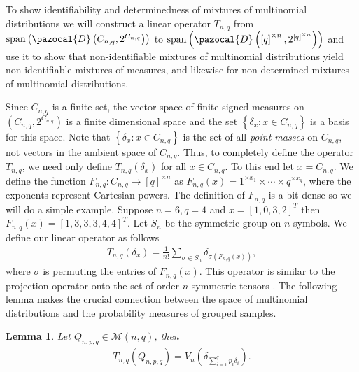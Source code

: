 \documentclass[aos,preprint]{imsart}
\def\l{\left}
\def\r{\right}
\def\sM{\pazocal{M}}
\def\sD{\pazocal{D}}
\def\sM{\mathscr{M}}
\def\spn{\operatorname{span}}
\theoremstyle{plain}
\newtheorem{lem}{Lemma}[section]
\theoremstyle{defintion}
\begin{document}
To show identifiability and determinedness of mixtures of multinomial distributions we will construct a linear operator $T_{n,q}$ from $\spn \l(\sD\l(C_{n,q},2^{C_{n,q}}\right)\r)$ to $\spn\l(\sD\l(\left[ q \right]^{\times n}, 2^{\left[ q \right]^{\times n}}\r)\r)$ and use it to show that non-identifiable mixtures of multinomial distributions yield non-identifiable mixtures of measures, and likewise for non-determined mixtures of multinomial distributions.

Since $C_{n,q}$ is a finite set, the vector space of finite signed measures on $\left( C_{n,q}, 2^{C_{n,q}} \right)$ is a finite dimensional space and the set $\left\{ \delta_x: x\in C_{n,q} \right\}$ is a basis for this space. Note that $\left\{ \delta_x: x\in C_{n,q} \right\}$ is the set of all {\em point masses} on $C_{n,q}$, not vectors in the ambient space of $C_{n,q}$. Thus, to completely define the operator $T_{n,q}$, we need only define $T_{n,q}\left( \delta_x \right)$ for all $x\in C_{n,q}$. To this end let $x = C_{n,q}$. We define the function $F_{n,q}:C_{n,q} \to \left[ q \right]^{\times n}$ as $F_{n,q}\l(x\r) =1^{\times x_1}\times \cdots \times q^{\times x_q}$, where the exponents represent Cartesian powers. The definition of $F_{n,q}$ is a bit dense so we will do a simple example. Suppose $n=6,q=4$ and $x= \left[ 1,0,3,2 \right]^T$ then $F_{n,q}\l(x\r) = \left[ 1,3,3,3,4,4 \right]^T$. Let $S_n$ be the symmetric group on $n$ symbols. We define our linear operator as follows
\begin{eqnarray*}
	T_{n,q}\left( \delta_x \right) = \frac{1}{n!} \sum_{\sigma \in S_n} \delta_{ \sigma\l(F_{n,q}(x)\r)},
\end{eqnarray*}
where $\sigma$ is permuting the entries of $F_{n,q}\left( x \right)$.
This operator is similar to the projection operator onto the set of order $n$ symmetric tensors \cite{symtensorrank}. The following lemma makes the crucial connection between the space of multinomial distributions and the probability measures of grouped samples.
\begin{lem}\label{lem:mult}
	Let $Q_{n,p,q} \in \sM\left( n,q \right)$, then 
	\begin{eqnarray*}
		T_{n,q}\left( Q_{n,p,q} \right) = V_n\left( \delta_{\sum_{i=1}^q p_i \delta_i} \right).
	\end{eqnarray*}
\end{lem}
\end{document}
